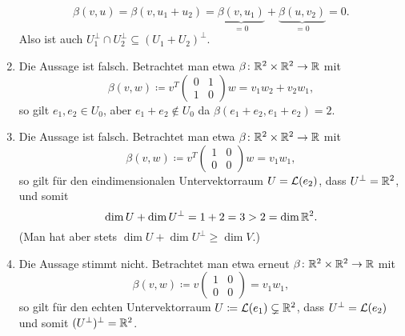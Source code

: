 \documentclass[a4paper, 10pt]{scrartcl}
\begin{document}
\begin{solution}
\begin{enumerate}[leftmargin=*]
      \[
          \beta(v, u)
        = \beta(v, u_1 + u_2)
        = \underbrace{\beta(v, u_1)}_{= 0} + \underbrace{\beta(u, v_2)}_{=0}
        = 0.
      \]
      Also ist auch $U_1^\perp \cap U_2^\perp \subseteq (U_1 + U_2)^\perp$.
    \item
      Die Aussage ist falsch.
      Betrachtet man etwa $\beta \colon \mathbb{R}^2 \times \mathbb{R}^2 \to \mathbb{R}$ mit
      \[
                  \beta(v, w)
        \coloneqq v^T \begin{pmatrix} 0 & 1 \\ 1 & 0 \end{pmatrix} w
        =         v_1 w_2 + v_2 w_1,
      \]
      so gilt $e_1, e_2 \in U_0$, aber $e_1 + e_2 \notin U_0$ da $\beta(e_1 + e_2, e_1 + e_2) = 2$.
    \item
      Die Aussage ist falsch.
      Betrachtet man etwa $\beta \colon \mathbb{R}^2 \times \mathbb{R}^2 \to \mathbb{R}$ mit
      \[
                  \beta(v, w)
        \coloneqq v^T \begin{pmatrix} 1 & 0 \\ 0 & 0 \end{pmatrix} w
        =         v_1 w_1,
      \]
      so gilt für den eindimensionalen Untervektorraum $U = \mathcal{L}(e_2)$, dass $U^\perp = \mathbb{R}^2$, und somit
      \[
          \dim U + \dim U^\perp
        = 1 + 2
        = 3 > 2
        = \dim \mathbb{R}^2.
      \]
      (Man hat aber stets $\dim U + \dim U^\perp \geq \dim V$.)
    \item
      Die Aussage stimmt nicht.
      Betrachtet man etwa erneut $\beta \colon \mathbb{R}^2 \times \mathbb{R}^2 \to \mathbb{R}$ mit
      \[
                  \beta(v, w)
        \coloneqq v \begin{pmatrix} 1 & 0 \\ 0 & 0 \end{pmatrix}
        =         v_1 w_1,
      \]
      so gilt für den echten Untervektorraum $U \coloneqq \mathcal{L}(e_1) \subsetneq \mathbb{R}^2$, dass $U^\perp = \mathcal{L}(e_2)$ und somit $(U^\perp)^\perp = \mathbb{R}^2$.
  \end{enumerate}
\end{solution}
\end{document}
